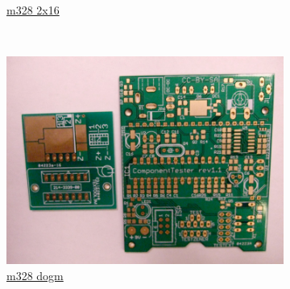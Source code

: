 \documentclass[pdftex,12pt,a4paper,english]{article}
\begin{document}
\begin{figure}[H]
\begin{subfigure}[b]{.3\textwidth}
	  {\href{run:./trunk/mega328/.}{m328 2x16}}
  \end{subfigure}
~
  \begin{subfigure}[b]{.3\textwidth}
    \centering
    \includegraphics[width=1.\textwidth]{../PNG/m328_moritz.JPG}
	  \\ \vspace{-0.5em}
	  {\href{run:./trunk/mega328_strip_grid_dogm/.}{m328 dogm}}
  \end{subfigure}
\end{figure}
\vspace{-1em}
\end{document}
